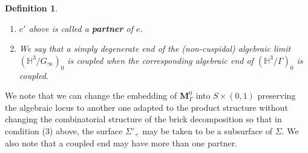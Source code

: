 \documentclass{amsart}
\newtheorem{definition}[theorem]{Definition}
\theoremstyle{definition}
\newcommand{\Int}{\operatorname{Int}}
\newcommand{\integers}{\mathbb{Z}}
\newcommand{\Image}{\operatorname{Im}}
\newcommand\HHH{{\mathbb H}}
\begin{document}
\begin{definition}
\begin{enumerate}
	Similarly when $e$ is downward, we call it coupled if there is an upward ends $e'$  satisfying analogous conditions to the upward case.
		\item $e'$ above is called a {\bf partner} of $e$.
		\item We say that a simply degenerate end of the (non-cuspidal) algebraic limit $(\HHH^3/G_\infty)_0$ is coupled when the corresponding algebraic end of $(\HHH^3/\Gamma)_0$ is coupled.
	\end{enumerate}
\end{definition}
We note that we can change the embedding of $\mathbf M_\Gamma^0$ into $S \times (0,1)$ preserving the algebraic locus to another one adapted to the product structure without changing the combinatorial structure of the brick decomposition so that 
in condition (3) above, the surface $\Sigma'_+$ may be taken to be a subsurface of $\Sigma$.
We also note that a coupled end may have more than one partner.


\begin{comment}
An end of $(\HHH^3/\Gamma)_0$ is said to be {\bf coupled} if it is sent by $f_\Gamma$ to $\Sigma \times \{t\}$ in $S\times (0,1)$ for an essential subsurface $\Sigma$ of $S$ and there is another end $e'$ of $(\HHH^3/\Gamma)_0$ sent to $\Sigma \times \{t'\}$ such that $\Sigma \times [t,t']$ is contained in $S \times (0,1) \setminus f_\Gamma((\HHH^3/\Gamma)_0)$.
We call $e'$ as above the counterpart of the coupled end $e$.
\end{comment}
\end{document}
